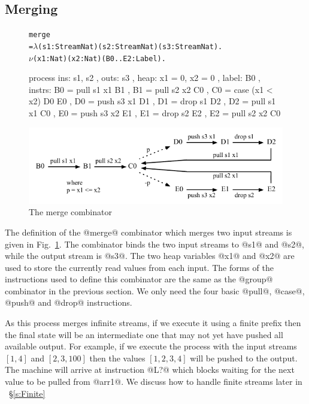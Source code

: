 \subsection{Merging}
\begin{figure}
\begin{alltt}
               merge
                 = \(\lambda\) (s1: Stream Nat) (s2: Stream Nat) (s3: Stream Nat). 
                   \(\nu\) (x1: Nat) (x2: Nat) (B0..E2: Label).
\end{alltt}
\begin{code}
                   process
                   { ins:    { s1, s2 }
                   , outs:   { s3 }
                   , heap:   { x1 = 0, x2 = 0 }
                   , label:  B0
                   , instrs: { B0 = pull s1 x1     B1 {}
                             , B1 = pull s2 x2     C0 {}
                             , C0 = case (x1 < x2) D0 {}  E0 {}
                             , D0 = push s3 x1     D1 {}
                             , D1 = drop s1        D2 {}
                             , D2 = pull s1 x1     C0 {}
                             , E0 = push s3 x2     E1 {}
                             , E1 = drop s2        E2 {}
                             , E2 = pull s2  x2    C0 {} } }
\end{code}

\medskip
\includegraphics[scale=1.1]{figures/state-merge.pdf}
\caption{The merge combinator}
\label{fig:Process:Merge}
\end{figure}

The definition of the @merge@ combinator which merges two input streams is given in Fig.~\ref{fig:Process:Merge}. The combinator binds the two input streams to @s1@ and @s2@, while the output stream is @s3@. The two heap variables @x1@ and @x2@ are used to store the currently read values from each input. The forms of the instructions used to define this combinator are the same as the @group@ combinator in the previous section. We only need the four basic @pull@, @case@, @push@ and @drop@ instructions.

As this process merges infinite streams, if we execute it using a finite prefix then the final state will be an intermediate one that may not yet have pushed all available output. For example, if we execute the process with the input streams $[1, 4]$ and $[2, 3, 100]$ then the values $[1, 2, 3, 4]$ will be pushed to the output. The machine will arrive at instruction @L?@ which blocks waiting for the next value to be pulled from @arr1@. We discuss how to handle finite streams later in ~\S\ref{s:Finite}


